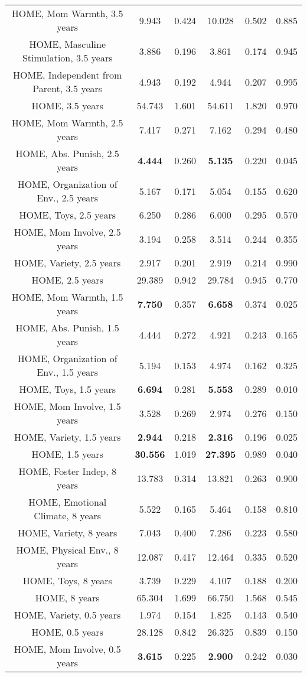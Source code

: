 \begin{longtable}{c c c c c c}
HOME, Mom Warmth, 3.5 years & 9.943 & 0.424 &  10.028 & 0.502 & 0.885 \\
HOME, Masculine Stimulation, 3.5 years & 3.886 & 0.196 &  3.861 & 0.174 & 0.945 \\
HOME, Independent from Parent, 3.5 years & 4.943 & 0.192 &  4.944 & 0.207 & 0.995 \\
HOME, 3.5 years & 54.743 & 1.601 &  54.611 & 1.820 & 0.970 \\
HOME, Mom Warmth, 2.5 years & 7.417 & 0.271 &  7.162 & 0.294 & 0.480 \\
HOME, Abs. Punish, 2.5 years & \textbf{4.444} & 0.260 &  \textbf{5.135} & 0.220 & 0.045 \\
HOME, Organization of Env., 2.5 years & 5.167 & 0.171 &  5.054 & 0.155 & 0.620 \\
HOME, Toys, 2.5 years & 6.250 & 0.286 &  6.000 & 0.295 & 0.570 \\
HOME, Mom Involve, 2.5 years & 3.194 & 0.258 &  3.514 & 0.244 & 0.355 \\
HOME, Variety, 2.5 years & 2.917 & 0.201 &  2.919 & 0.214 & 0.990 \\
HOME, 2.5 years & 29.389 & 0.942 &  29.784 & 0.945 & 0.770 \\
HOME, Mom Warmth, 1.5 years & \textbf{7.750} & 0.357 &  \textbf{6.658} & 0.374 & 0.025 \\
HOME, Abs. Punish, 1.5 years & 4.444 & 0.272 &  4.921 & 0.243 & 0.165 \\
HOME, Organization of Env., 1.5 years & 5.194 & 0.153 &  4.974 & 0.162 & 0.325 \\
HOME, Toys, 1.5 years & \textbf{6.694} & 0.281 &  \textbf{5.553} & 0.289 & 0.010 \\
HOME, Mom Involve, 1.5 years & 3.528 & 0.269 &  2.974 & 0.276 & 0.150 \\
HOME, Variety, 1.5 years & \textbf{2.944} & 0.218 &  \textbf{2.316} & 0.196 & 0.025 \\
HOME, 1.5 years & \textbf{30.556} & 1.019 &  \textbf{27.395} & 0.989 & 0.040 \\
HOME, Foster Indep, 8 years & 13.783 & 0.314 &  13.821 & 0.263 & 0.900 \\
HOME, Emotional Climate, 8 years & 5.522 & 0.165 &  5.464 & 0.158 & 0.810 \\
HOME, Variety, 8 years & 7.043 & 0.400 &  7.286 & 0.223 & 0.580 \\
HOME, Physical Env., 8 years & 12.087 & 0.417 &  12.464 & 0.335 & 0.520 \\
HOME, Toys, 8 years & 3.739 & 0.229 &  4.107 & 0.188 & 0.200 \\
HOME, 8 years & 65.304 & 1.699 &  66.750 & 1.568 & 0.545 \\
HOME, Variety, 0.5 years & 1.974 & 0.154 &  1.825 & 0.143 & 0.540 \\
HOME, 0.5 years & 28.128 & 0.842 &  26.325 & 0.839 & 0.150 \\
HOME, Mom Involve, 0.5 years & \textbf{3.615} & 0.225 &  \textbf{2.900} & 0.242 & 0.030 \\
\bottomrule
\end{longtable}
